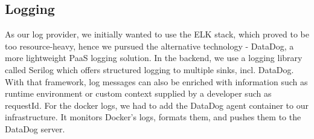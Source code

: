 \subsection{Logging}

As our log provider, we initially wanted to use the ELK stack, which proved to be too resource-heavy, hence we pursued the alternative technology - DataDog, a more lightweight PaaS logging solution. In the backend, we use a logging library called Serilog which offers structured logging to multiple sinks, incl. DataDog. With that framework, log messages can also be enriched with information such as runtime environment or custom context supplied by a developer such as requestId. For the docker logs, we had to add the DataDog agent container to our infrastructure. It monitors Docker’s logs, formats them, and pushes them to the DataDog server.
